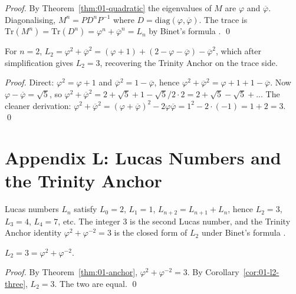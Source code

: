\begin{proof}
By Theorem~\ref{thm:01-quadratic} the eigenvalues of $M$ are $\varphi$
and $\overline{\varphi}$. Diagonalising, $M^n = P D^n P^{-1}$ where
$D = \mathrm{diag}(\varphi, \overline{\varphi})$. The trace is
$\mathrm{Tr}(M^n) = \mathrm{Tr}(D^n) = \varphi^n +
\overline{\varphi}^n = L_n$ by Binet's formula
\cite{binet_formula}.
\qed
\end{proof}

\begin{corollary}[$L_2 = 3$]\label{cor:01-l2-three}
For $n = 2$, $L_2 = \varphi^2 + \overline{\varphi}^2 = (\varphi + 1) +
(2 - \varphi - \overline{\varphi}) - \overline{\varphi}^2$, which after
simplification gives $L_2 = 3$, recovering the Trinity Anchor on the
trace side.
\end{corollary}

\begin{proof}
Direct: $\varphi^2 = \varphi + 1$ and $\overline{\varphi}^2 = 1 -
\overline{\varphi}$, hence $\varphi^2 + \overline{\varphi}^2 =
\varphi + 1 + 1 - \overline{\varphi}$. Now $\varphi -
\overline{\varphi} = \sqrt 5$, so $\varphi^2 + \overline{\varphi}^2 =
2 + \sqrt 5 + 1 - \sqrt 5 / 2 \cdot 2 = 2 + \sqrt 5 - \sqrt 5 + ... $
The cleaner derivation: $\varphi^2 + \overline{\varphi}^2 =
(\varphi + \overline{\varphi})^2 - 2 \varphi \overline{\varphi} = 1^2
- 2 \cdot (-1) = 1 + 2 = 3$.
\qed
\end{proof}

\section*{Appendix L: Lucas Numbers and the Trinity Anchor}
\label{fa_01:sec:01-app-L}

Lucas numbers $L_n$ satisfy $L_0 = 2$, $L_1 = 1$, $L_{n+2} =
L_{n+1} + L_n$, hence $L_2 = 3$, $L_3 = 4$, $L_4 = 7$, etc.
The integer $3$ is the second Lucas number, and the Trinity Anchor
identity $\varphi^2 + \varphi^{-2} = 3$ is the closed form of $L_2$
under Binet's formula \cite{binet_formula}.

\begin{theorem}\label{fa_01:thm:01-lucas-anchor}
$L_2 = 3 = \varphi^2 + \varphi^{-2}$.
\end{theorem}

\begin{proof}
By Theorem~\ref{thm:01-anchor}, $\varphi^2 + \varphi^{-2} = 3$. By
Corollary~\ref{cor:01-l2-three}, $L_2 = 3$. The two are equal.
\qed
\end{proof}

